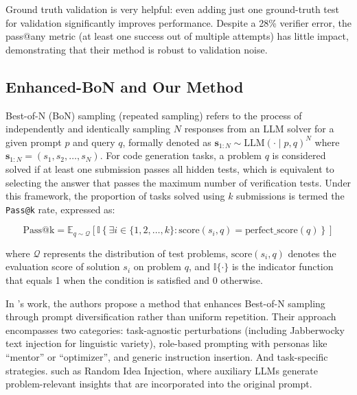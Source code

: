 \documentclass{article} %
\theoremstyle{definition}
\theoremstyle{remark}
\begin{document}
Ground truth validation is very helpful: even adding just one ground-truth test for validation significantly improves performance. Despite a 28\% verifier error, the pass@any metric (at least one success out of multiple attempts) has little impact, demonstrating that their method is robust to validation noise.



\subsection{Enhanced-BoN and Our Method}
\label{apps:bon}
Best-of-N (BoN) sampling (repeated sampling) refers to the process of independently and identically sampling $N$ responses from an LLM solver for a given prompt $p$ and query $q$, formally denoted as $\boldsymbol{s}_{1:N} \sim \text{LLM}(\cdot \mid p, q)^N$ where $\boldsymbol{s}_{1:N} = (s_1, s_2, \ldots, s_N)$. For code generation tasks, a problem $q$ is considered solved if at least one submission passes all hidden tests, which is equivalent to selecting the answer that passes the maximum number of verification tests. Under this framework, the proportion of tasks solved using $k$ submissions is termed the \texttt{Pass@k} rate, expressed as:

\begin{equation}
\text{Pass@k} = \mathbb{E}_{q \sim \mathcal{Q}} \left[ \mathbb{I}\left\{ \exists i \in \{1, 2, \ldots, k\} : \text{score}(s_i, q) = \text{perfect\_score}(q) \right\} \right]
\end{equation}

where $\mathcal{Q}$ represents the distribution of test problems, $\text{score}(s_i, q)$ denotes the evaluation score of solution $s_i$ on problem $q$, and $\mathbb{I}\{\cdot\}$ is the indicator function that equals 1 when the condition is satisfied and 0 otherwise.

In \cite{wang2025diversified}'s work, the authors propose a method that enhances Best-of-N sampling through prompt diversification rather than uniform repetition. Their approach encompasses two categories: task-agnostic perturbations (including Jabberwocky text injection for linguistic variety), role-based prompting with personas like ``mentor'' or ``optimizer'', and generic instruction insertion. And task-specific strategies. such as Random Idea Injection, where auxiliary LLMs generate problem-relevant insights that are incorporated into the original prompt. 
\end{document}
